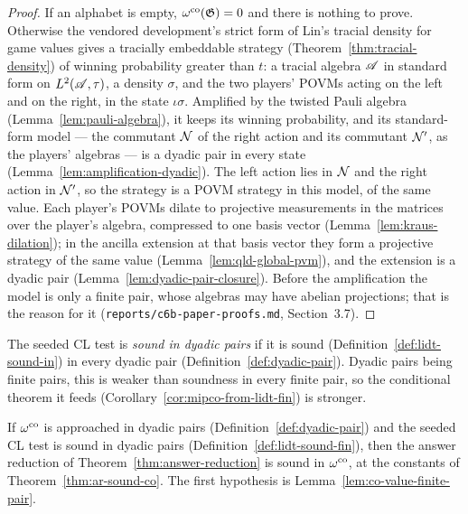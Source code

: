 \begin{proof}
\leanok
If an alphabet is empty, $\omegaco(\game) = 0$ and there is nothing to prove. Otherwise the
vendored development's strict form of Lin's tracial density for game values gives a tracially
embeddable strategy (Theorem~\ref{thm:tracial-density}) of winning probability greater than $t$: a
tracial algebra $\alg$ in standard form on $L^2(\alg, \tau)$, a density $\sigma$, and the two
players' POVMs acting on the left and on the right, in the state $\iota\sigma$. Amplified by the
twisted Pauli algebra (Lemma~\ref{lem:pauli-algebra}), it keeps its winning probability, and its
standard-form model --- the commutant $\cal{N}$ of the right action and its commutant $\cal{N}'$, as
the players' algebras --- is a dyadic pair in every state (Lemma~\ref{lem:amplification-dyadic}).
The left action lies in $\cal{N}$ and the right action in $\cal{N}'$, so the strategy is a POVM
strategy in this model, of the same value. Each player's POVMs dilate to projective measurements in
the matrices over the player's algebra, compressed to one basis vector
(Lemma~\ref{lem:kraus-dilation}); in the ancilla extension at that basis vector they form a
projective strategy of the same value (Lemma~\ref{lem:qld-global-pvm}), and the extension is a
dyadic pair (Lemma~\ref{lem:dyadic-pair-closure}). Before the amplification the model is only a
finite pair, whose algebras may have abelian projections; that is the reason for it
(\texttt{reports/c6b-paper-proofs.md}, Section~3.7).
\end{proof}

\begin{definition}
\label{def:lidt-sound-fin}
\leanok
The seeded CL test is \emph{sound in dyadic pairs} if it is sound (Definition~\ref{def:lidt-sound-in})
in every dyadic pair (Definition~\ref{def:dyadic-pair}). Dyadic pairs being finite pairs, this is
weaker than soundness in every finite pair, so the conditional theorem it feeds
(Corollary~\ref{cor:mipco-from-lidt-fin}) is stronger.
\end{definition}

\begin{theorem}
\label{thm:ar-sound-co-fin}
\leanok
If $\omegaco$ is approached in dyadic pairs (Definition~\ref{def:dyadic-pair}) and the seeded CL
test is sound in dyadic pairs (Definition~\ref{def:lidt-sound-fin}), then the answer reduction of
Theorem~\ref{thm:answer-reduction} is sound in $\omegaco$, at the constants of
Theorem~\ref{thm:ar-sound-co}. The first hypothesis is Lemma~\ref{lem:co-value-finite-pair}.
\end{theorem}

